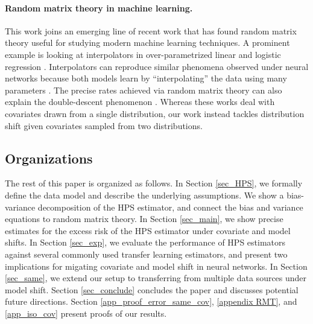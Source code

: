 

\paragraph{Random matrix theory in machine learning.}
This work joins an emerging line of recent work that has found random matrix theory useful for studying modern machine learning techniques.
A prominent example is looking at interpolators in over-parametrized linear and logistic regression \cite{bartlett2020benign,hastie2019surprises,montanari2019generalization,liang2020just,liang2020precise}.
Interpolators can reproduce similar phenomena observed under neural networks because both models learn by ``interpolating'' the data using many parameters \cite{mei2019generalization}.
The precise rates achieved via random matrix theory can also explain the double-descent phenomenon \cite{belkin2019reconciling}.
Whereas these works deal with covariates drawn from a single distribution, our work instead tackles distribution shift given covariates sampled from two distributions. 





\subsection{Organizations}
The rest of this paper is organized as follows.
In Section \ref{sec_HPS}, we formally define the data model and describe the underlying assumptions.
We show a bias-variance decomposition of the HPS estimator, and connect the bias and variance equations to random matrix theory.
In Section \ref{sec_main}, we show precise estimates for the excess risk of the HPS estimator under covariate and model shifts.
In Section \ref{sec_exp}, we evaluate the performance of HPS estimators against several commonly used transfer learning estimators, and present two implications for migating covariate and model shift in neural networks.
In Section \ref{sec_same}, we extend our setup to transferring from multiple data sources under model shift.
Section \ref{sec_conclude} concludes the paper and discusses potential future directions.
Section \ref{app_proof_error_same_cov}, \ref{appendix RMT}, and \ref{app_iso_cov} present proofs of our results.